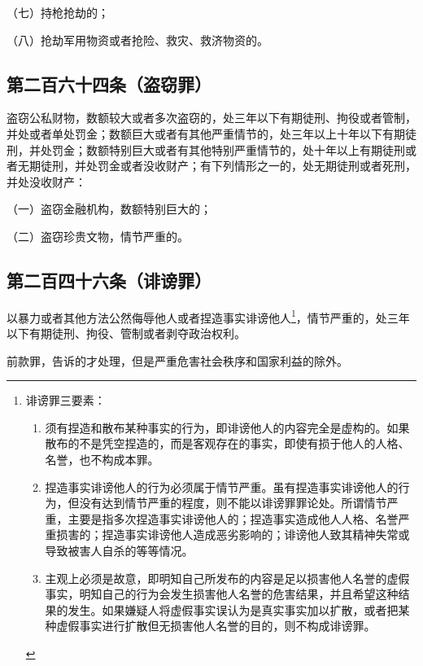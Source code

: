 \documentclass[utf-8,10pt]{ctexart}%
\begin{document}
（七）持枪抢劫的；

（八）抢劫军用物资或者抢险、救灾、救济物资的。
\subsection{第二百六十四条（盗窃罪）}
盗窃公私财物，数额较大或者多次盗窃的，处三年以下有期徒刑、拘役或者管制，并处或者单处罚金；数额巨大或者有其他严重情节的，处三年以上十年以下有期徒刑，并处罚金；数额特别巨大或者有其他特别严重情节的，处十年以上有期徒刑或者无期徒刑，并处罚金或者没收财产；有下列情形之一的，处无期徒刑或者死刑，并处没收财产：

（一）盗窃金融机构，数额特别巨大的；

（二）盗窃珍贵文物，情节严重的。
\subsection{第二百四十六条（诽谤罪）}
以暴力或者其他方法公然侮辱他人或者捏造事实诽谤他人\footnote{
诽谤罪三要素：
\begin{enumerate}
\item 须有捏造和散布某种事实的行为，即诽谤他人的内容完全是虚构的。如果散布的不是凭空捏造的，而是客观存在的事实，即使有损于他人的人格、名誉，也不构成本罪。
\item 捏造事实诽谤他人的行为必须属于情节严重。虽有捏造事实诽谤他人的行为，但没有达到情节严重的程度，则不能以诽谤罪罪论处。所谓情节严重，主要是指多次捏造事实诽谤他人的；捏造事实造成他人人格、名誉严重损害的；捏造事实诽谤他人造成恶劣影响的；诽谤他人致其精神失常或导致被害人自杀的等等情况。
\item 主观上必须是故意，即明知自己所发布的内容是足以损害他人名誉的虚假事实，明知自己的行为会发生损害他人名誉的危害结果，并且希望这种结果的发生。如果嫌疑人将虚假事实误认为是真实事实加以扩散，或者把某种虚假事实进行扩散但无损害他人名誉的目的，则不构成诽谤罪。
\end{enumerate}
}，情节严重的，处三年以下有期徒刑、拘役、管制或者剥夺政治权利。

前款罪，告诉的才处理，但是严重危害社会秩序和国家利益的除外。
\end{document}
